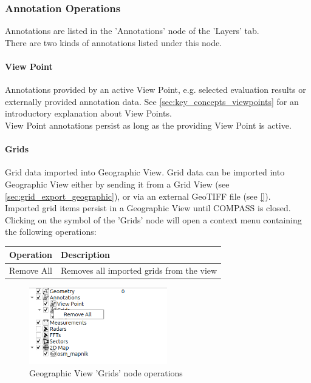 \subsubsection{Annotation Operations}
\label{sec:geo_annotation_ops}  

Annotations are listed in the 'Annotations' node of the 'Layers' tab. \\

There are two kinds of annotations listed under this node.

\paragraph*{View Point} Annotations provided by an active View Point, e.g. selected evaluation results or externally provided annotation data.
See \ref{sec:key_concepts_viewpoints} for an introductory explanation about View Points. \\

View Point annotations persist as long as the providing View Point is active.

\paragraph*{Grids} Grid data imported into Geographic View. Grid data can be imported into 
Geographic View either by sending it from a Grid View (see \ref{sec:grid_export_geographic}), or via an external GeoTIFF file (see \ref{}). \\

Imported grid items persist in a Geographic View until COMPASS is closed. \\

Clicking on the symbol of the 'Grids' node will open a context menu containing the following operations:

\begin{table}[H]
    \center
    \begin{tabular}{ | l | l |}
      \hline
      \textbf{Operation} & \textbf{Description} \\ \hline
      Remove All & Removes all imported grids from the view \\ \hline
    \end{tabular}
\end{table}

\begin{figure}[H]
    \center
    \hspace*{-2.5cm}
    \includegraphics[width=6cm,frame]{figures/geoview_gridops_grids.png}
  \caption{Geographic View 'Grids' node operations}
\end{figure}

